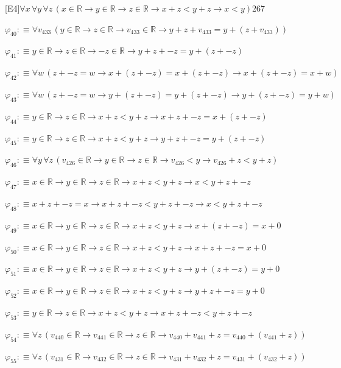 \begin{fullproof}{[E4]}{$\forall x\,\forall y\,\forall z\,(x \in \mathbb{R} \to y \in \mathbb{R} \to z \in \mathbb{R} \to x + z < y + z \to x < y)$}{267}
\begin{abbrevlist}
\item $\varphi_{40} :\equiv \forall v_{433}\,(y \in \mathbb{R} \to z \in \mathbb{R} \to v_{433} \in \mathbb{R} \to y + z + v_{433} = y + (z + v_{433}))$
\item $\varphi_{41} :\equiv y \in \mathbb{R} \to z \in \mathbb{R} \to -z \in \mathbb{R} \to y + z + -z = y + (z + -z)$
\item $\varphi_{42} :\equiv \forall w\,(z + -z = w \to x + (z + -z) = x + (z + -z) \to x + (z + -z) = x + w)$
\item $\varphi_{43} :\equiv \forall w\,(z + -z = w \to y + (z + -z) = y + (z + -z) \to y + (z + -z) = y + w)$
\item $\varphi_{44} :\equiv y \in \mathbb{R} \to z \in \mathbb{R} \to x + z < y + z \to x + z + -z = x + (z + -z)$
\item $\varphi_{45} :\equiv y \in \mathbb{R} \to z \in \mathbb{R} \to x + z < y + z \to y + z + -z = y + (z + -z)$
\item $\varphi_{46} :\equiv \forall y\,\forall z\,(v_{426} \in \mathbb{R} \to y \in \mathbb{R} \to z \in \mathbb{R} \to v_{426} < y \to v_{426} + z < y + z)$
\item $\varphi_{47} :\equiv x \in \mathbb{R} \to y \in \mathbb{R} \to z \in \mathbb{R} \to x + z < y + z \to x < y + z + -z$
\item $\varphi_{48} :\equiv x + z + -z = x \to x + z + -z < y + z + -z \to x < y + z + -z$
\item $\varphi_{49} :\equiv x \in \mathbb{R} \to y \in \mathbb{R} \to z \in \mathbb{R} \to x + z < y + z \to x + (z + -z) = x + 0$
\item $\varphi_{50} :\equiv x \in \mathbb{R} \to y \in \mathbb{R} \to z \in \mathbb{R} \to x + z < y + z \to x + z + -z = x + 0$
\item $\varphi_{51} :\equiv x \in \mathbb{R} \to y \in \mathbb{R} \to z \in \mathbb{R} \to x + z < y + z \to y + (z + -z) = y + 0$
\item $\varphi_{52} :\equiv x \in \mathbb{R} \to y \in \mathbb{R} \to z \in \mathbb{R} \to x + z < y + z \to y + z + -z = y + 0$
\item $\varphi_{53} :\equiv y \in \mathbb{R} \to z \in \mathbb{R} \to x + z < y + z \to x + z + -z < y + z + -z$
\item $\varphi_{54} :\equiv \forall z\,(v_{440} \in \mathbb{R} \to v_{441} \in \mathbb{R} \to z \in \mathbb{R} \to v_{440} + v_{441} + z = v_{440} + (v_{441} + z))$
\item $\varphi_{55} :\equiv \forall z\,(v_{431} \in \mathbb{R} \to v_{432} \in \mathbb{R} \to z \in \mathbb{R} \to v_{431} + v_{432} + z = v_{431} + (v_{432} + z))$

\end{abbrevlist}
\end{fullproof}
